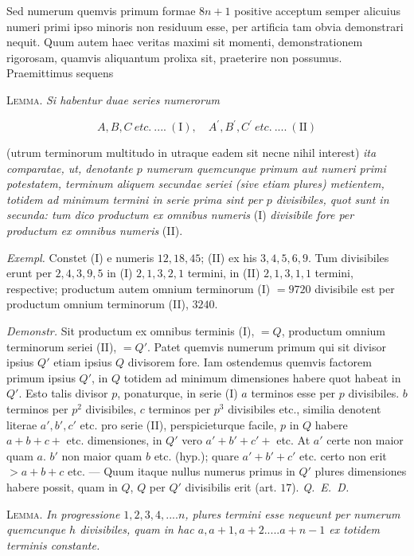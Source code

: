 
Sed numerum quemvis primum formae $8n+1$ positive acceptum semper alicuius numeri primi ipso minoris non residuum esse, per artificia tam obvia demonstrari nequit. Quum autem haec veritas maximi sit momenti, demonstrationem rigorosam, quamvis aliquantum prolixa sit, praeterire non possumus. Praemittimus sequens

\textsc{Lemma.} \textit{Si habentur duae series numerorum}

\[
A,B,C\ \textit{etc.}\ ....\ (\mathrm{I}),\quad A^{\prime},B^{\prime},C^{\prime}\ \textit{etc.}\ ....\ (\mathrm{II})
\]

(utrum terminorum multitudo in utraque eadem sit necne nihil interest) \textit{ita comparatae, ut, denotante $p$ numerum quemcunque primum aut numeri primi potestatem, terminum aliquem secundae seriei (sive etiam plures) metientem, totidem ad minimum termini in serie prima sint per $p$ divisibiles, quot sunt in secunda: tum dico productum ex omnibus numeris} (I) \textit{divisibile fore per productum ex omnibus numeris} (II).

\textit{Exempl.} Constet (I) e numeris $12,18,45$; (II) ex his $3,4,5,6,9$. Tum divisibiles erunt per $2,4,3,9,5$ in (I) $2,1,3,2,1$ termini, in (II) $2,1,3,1,1$ termini, respective; productum autem omnium terminorum (I) $=9720$ divisibile est per productum omnium terminorum (II), $3240$.

\textit{Demonstr.} Sit productum ex omnibus terminis (I), $=Q$, productum omnium terminorum seriei (II), $=Q'$. Patet quemvis numerum primum qui sit divisor ipsius $Q'$ etiam ipsius $Q$ divisorem fore. Iam ostendemus quemvis factorem primum ipsius $Q'$, in $Q$ totidem ad minimum dimensiones habere quot habeat in $Q'$. Esto talis divisor $p$, ponaturque, in serie (I) $a$ terminos esse per $p$ divisibiles. $b$ terminos per $p^2$ divisibiles, $c$ terminos per $p^3$ divisibiles etc., similia denotent literae $a',b',c'$ etc. pro serie (II), perspicieturque facile, $p$ in $Q$ habere $a+b+c+$ etc. dimensiones, in $Q'$ vero $a'+b'+c'+$ etc. At $a'$ certe non maior quam $a$. $b'$ non maior quam $b$ etc. (hyp.); quare $a'+b'+c'$ etc. certo non erit $>a+b+c$ etc. --- Quum itaque nullus numerus primus in $Q'$ plures dimensiones habere possit, quam in $Q$, $Q$ per $Q'$ divisibilis erit (art. $17$). \textit{Q.\ E.\ D.}


\textsc{Lemma.} \textit{In progressione $1,2,3,4,....n$, plures termini esse nequeunt per numerum quemcunque $h$ divisibiles, quam in hac $a,a+1,a+2.....a+n-1$ ex totidem terminis constante.}

